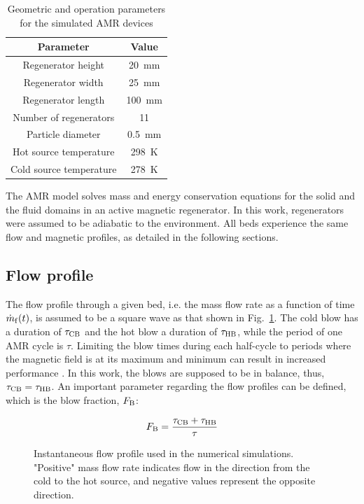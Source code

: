 \documentclass[draft]{svjour3}
\begin{document}
\begin{table}[!ht]
  \centering
  \caption{Geometric and operation parameters for the simulated AMR devices}
  \begin{tabular}{c|c}
\hline
    \textbf{Parameter}&\textbf{Value}\\
\hline
Regenerator height & \SI{20}{\mm}\\
Regenerator width & \SI{25}{\mm}\\
Regenerator length & \SI{100}{\mm}\\
Number of regenerators & \num{11} \\
Particle diameter & \SI{0.5}{\mm}\\
Hot source temperature & \SI{298}{\kelvin}\\
Cold source temperature & \SI{278}{\kelvin}\\
\hline
  \end{tabular}
  \label{tab:params}
\end{table}

The AMR model solves mass and energy conservation equations for the solid and the fluid domains in an active magnetic regenerator. In this work, regenerators were assumed to be adiabatic to the environment. All beds experience the same flow and magnetic profiles, as detailed in the following sections.

\subsection{Flow profile}
\label{sec:flow-profile}


The flow profile through a given bed, i.e. the mass flow rate as a function of time $\dot{m}_{\mathrm{f}} (t)$, is assumed to be a square wave as that shown in Fig.~\ref{fig:mprofile}. The cold blow has a duration of $\tau_{\mathrm{CB}}$ and the  hot blow a duration of $\tau_{\mathrm{HB}}$, while the period of one AMR cycle is $\tau$. Limiting the blow times during each half-cycle to periods where the magnetic field is at its maximum and minimum can result in increased performance \cite{bib:nakashima17_avaliac}. In this work, the blows are supposed to be in balance, thus, $\tau_{\mathrm{CB}} = \tau_{\mathrm{HB}}$. An important parameter regarding the flow profiles can be defined, which is the blow fraction, $F_{\mathrm{B}}$:

\begin{equation}
  \label{eq:1}
  F_{\mathrm{B}} = \frac{\tau_{\mathrm{CB}} + \tau_{\mathrm{HB}}}{\tau}
\end{equation}

\begin{figure}[!ht]
  \centering
  \caption{Instantaneous flow profile used in the numerical simulations. "Positive" mass flow rate indicates flow in the direction from the cold to the hot source, and negative values represent the opposite direction. }
  \label{fig:mprofile}
\end{figure}
\end{document}
